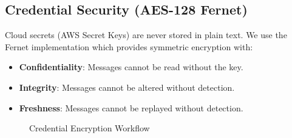 \subsection{Credential Security (AES-128 Fernet)}
Cloud secrets (AWS Secret Keys) are never stored in plain text. We use the Fernet implementation which provides symmetric encryption with:
\begin{itemize}
    \item \textbf{Confidentiality}: Messages cannot be read without the key.
    \item \textbf{Integrity}: Messages cannot be altered without detection.
    \item \textbf{Freshness}: Messages cannot be replayed without detection.
\end{itemize}

\begin{figure}[h]
\centering
{}
\caption{Credential Encryption Workflow}
\label{fig:encryption_workflow}
\end{figure}


\newpage
